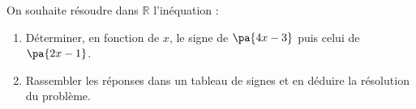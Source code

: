 \begin{exo}{}
	On souhaite résoudre dans $\mathbb{R}$ l'inéquation : 
	\begin{enumerate}
		\item Déterminer, en fonction de $x$, le signe de $\pa{4x - 3}$ puis celui de $\pa{2x - 1}$.
		\item Rassembler les réponses dans un tableau de signes et en déduire la résolution du problème.
	\end{enumerate}
\end{exo}
